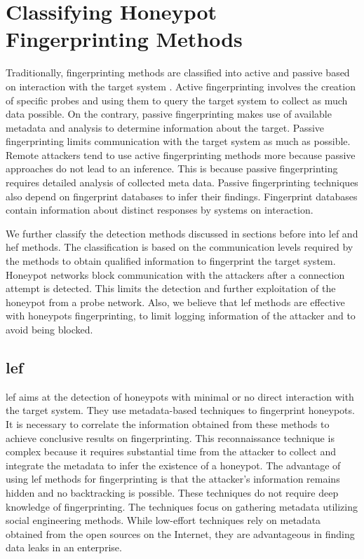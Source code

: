 \section{Classifying Honeypot Fingerprinting Methods}
\label{sec:chfm}

Traditionally, fingerprinting methods are classified into active and passive based on interaction with the target system \cite{spitzner}. Active fingerprinting involves the creation of specific probes and using them to query the target system to collect as much data possible. On the contrary, passive fingerprinting makes use of available metadata and analysis to determine information about the target. Passive fingerprinting limits communication with the target system as much as possible. Remote attackers tend to use active fingerprinting methods more because passive approaches do not lead to an inference. This is because passive fingerprinting requires detailed analysis of collected meta data. Passive fingerprinting techniques also depend on fingerprint databases to infer their findings. Fingerprint databases contain information about distinct responses by systems on interaction.
   
We further classify the detection methods discussed in sections before into \acrfull{lef} and \acrfull{hef} methods. The classification is based on the communication levels required by the methods to obtain qualified information to fingerprint the target system. Honeypot networks block communication with the attackers after a connection attempt is detected. This limits the detection and further exploitation of the honeypot from a probe network. Also, we believe that \acrshort{lef} methods are effective with honeypots fingerprinting, to limit logging information of the attacker and to avoid being blocked. 

 \subsection{\acrfull{lef}}
 \acrfull{lef} aims at the detection of honeypots with minimal or no direct interaction with the target system. They use metadata-based techniques to fingerprint honeypots. It is necessary to correlate the information obtained from these methods to achieve conclusive results on fingerprinting. This reconnaissance technique is complex because it requires substantial time from the attacker to collect and integrate the metadata to infer the existence of a honeypot. The advantage of using \acrshort{lef} methods for fingerprinting is that the attacker's information remains hidden and no backtracking is possible. These techniques do not require deep knowledge of fingerprinting. The techniques focus on gathering metadata utilizing social engineering methods. While low-effort techniques rely on metadata obtained from the open sources on the Internet, they are advantageous in finding data leaks in an enterprise. 
 
